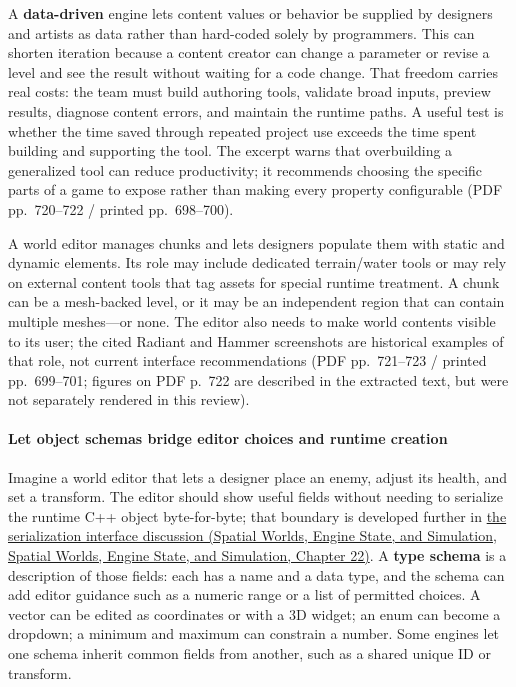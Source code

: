 A \textbf{data-driven} engine lets content values or behavior be supplied by designers and artists as data rather than hard-coded solely by programmers. This can shorten iteration because a content creator can change a parameter or revise a level and see the result without waiting for a code change. That freedom carries real costs: the team must build authoring tools, validate broad inputs, preview results, diagnose content errors, and maintain the runtime paths. A useful test is whether the time saved through repeated project use exceeds the time spent building and supporting the tool. The excerpt warns that overbuilding a generalized tool can reduce productivity; it recommends choosing the specific parts of a game to expose rather than making every property configurable (PDF pp.~720--722 / printed pp.~698--700).

A world editor manages chunks and lets designers populate them with static and dynamic elements. Its role may include dedicated terrain/water tools or may rely on external content tools that tag assets for special runtime treatment. A chunk can be a mesh-backed level, or it may be an independent region that can contain multiple meshes---or none. The editor also needs to make world contents visible to its user; the cited Radiant and Hammer screenshots are historical examples of that role, not current interface recommendations (PDF pp.~721--723 / printed pp.~699--701; figures on PDF p.~722 are described in the extracted text, but were not separately rendered in this review).

\paragraph{Let object schemas bridge editor choices and runtime creation}\label{06-engine-ii-ch032-let-object-schemas-bridge-editor-choices-and-runtime-creation}

Imagine a world editor that lets a designer place an enemy, adjust its health, and set a transform. The editor should show useful fields without needing to serialize the runtime C++ object byte-for-byte; that boundary is developed further in \href{../05-Spatial-Worlds-Engine-State-and-Simulation/main.pdf\#nameddest=06-engine-ii-ch033-serialization-is-an-interface-between-tools-and-execution}{the serialization interface discussion (Spatial Worlds, Engine State, and Simulation, Spatial Worlds, Engine State, and Simulation, Chapter 22)}. A \textbf{type schema} is a description of those fields: each has a name and a data type, and the schema can add editor guidance such as a numeric range or a list of permitted choices. A vector can be edited as coordinates or with a 3D widget; an enum can become a dropdown; a minimum and maximum can constrain a number. Some engines let one schema inherit common fields from another, such as a shared unique ID or transform.

